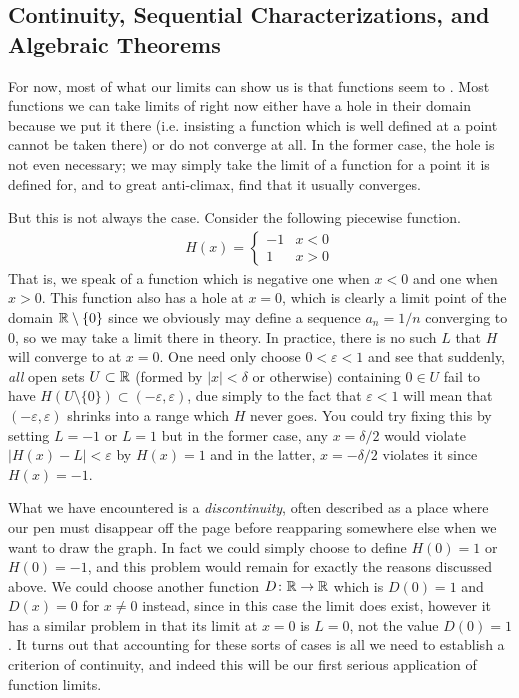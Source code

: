 \documentclass[11pt]{article}
\begin{document}
\subsection{Continuity, Sequential Characterizations, and Algebraic Theorems}

For now, most of what our limits can show us is that functions seem to . Most functions we can take limits of right now either have a hole in their domain because we put it there (i.e. insisting a function which is well defined at a point cannot be taken there) or do not converge at all. In the former case, the hole is not even necessary; we may simply take the limit of a function for a point it is defined for, and to great anti-climax, find that it usually converges.

But this is not always the case. Consider the following piecewise function. \begin{gather*}
H(x) = \left\{ \begin{matrix} -1 & x < 0 \\ 1 & x > 0\end{matrix}\right.
\end{gather*}
That is, we speak of a function which is negative one when $x < 0$ and one when $x > 0$. This function also has a hole at $x = 0$, which is clearly a limit point of the domain $\mathbb{R} \setminus\{ 0 \}$ since we obviously may define a sequence $a_n = 1/n$ converging to $0$, so we may take a limit there in theory. In practice, there is no such $L$ that $H$ will converge to at $x=0$. One need only choose $0 < \varepsilon < 1$ and see that suddenly, \emph{all} open sets $U \subset \mathbb{R}$ (formed by $|x| < \delta$ or otherwise) containing $0 \in U$ fail to have $H(U \setminus \{0\}) \subset (-\varepsilon, \varepsilon)$, due simply to the fact that $\varepsilon < 1$ will mean that $(-\varepsilon, \varepsilon)$ shrinks into a range which $H$ never goes. You could try fixing this by setting $L = -1$ or $L=1$ but in the former case, any $x=\delta/2$ would violate $|H(x) - L| < \varepsilon$ by $H(x) = 1$ and in the latter, $x=-\delta/2$ violates it since $H(x) = -1$.

What we have encountered is a \emph{discontinuity}, often described as a place where our pen must disappear off the page before reapparing somewhere else when we want to draw the graph. In fact we could simply choose to define $H(0) = 1$ or $H(0) = -1$, and this problem would remain for exactly the reasons discussed above. We could choose another function $D\colon \mathbb{R} \to \mathbb{R}$ which is $D(0) = 1$ and $D(x) = 0$ for $x \neq 0$ instead, since in this case the limit does exist, however it has a similar problem in that its limit at $x=0$ is $L=0$, not the value $D(0)=1$. It turns out that accounting for these sorts of cases is all we need to establish a criterion of continuity, and indeed this will be our first serious application of function limits.
\end{document}
